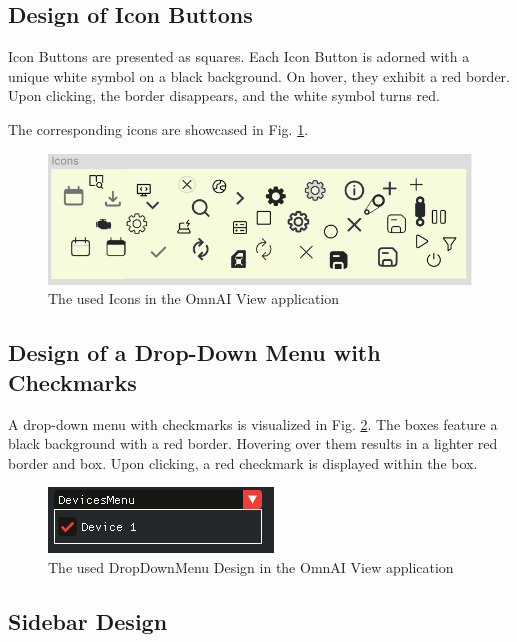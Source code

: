 \documentclass[]{scrreprt}
\begin{document}
\begin{itemize}
\subsection{Design of Icon Buttons}

Icon Buttons are presented as squares. Each Icon Button is adorned with a unique white symbol on a black background. On hover, they exhibit a red border. Upon clicking, the border disappears, and the white symbol turns red.

The corresponding icons are showcased in Fig. \ref{fig: IconImages}.

\begin{figure}
    \includegraphics[width=.7\textwidth]{assets/pictures/Icons.png}
    \caption[]{The used Icons in the OmnAI View application}
    \label{fig: IconImages}
\end{figure}

\subsection{Design of a Drop-Down Menu with Checkmarks}

A drop-down menu with checkmarks is visualized in Fig. \ref{fig: DragandDropwithCheckmarks}. The boxes feature a black background with a red border. Hovering over them results in a lighter red border and box. Upon clicking, a red checkmark is displayed within the box.

\begin{figure}
    \includegraphics[width=.5\textwidth]{assets/pictures/DropDownMenu.png}
    \caption[]{The used DropDownMenu Design in the OmnAI View application}
    \label{fig: DragandDropwithCheckmarks}
\end{figure}

\subsection{Sidebar Design}


\end{itemize}
\end{document}
